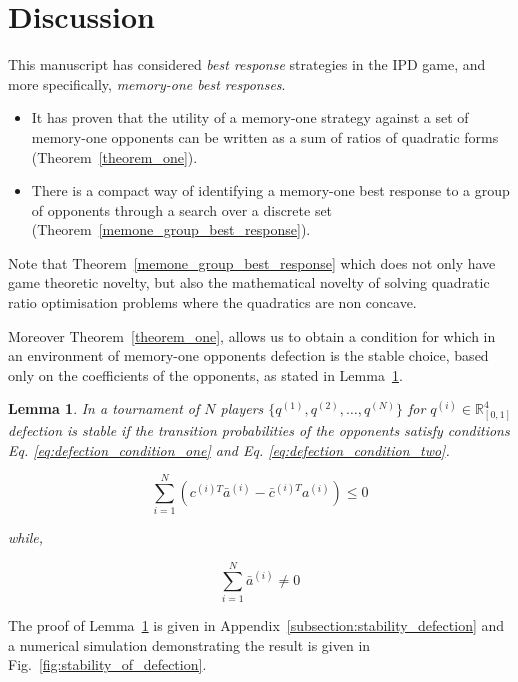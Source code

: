 \documentclass[10pt]{article}
\newcommand{\R}{\mathbb{R}}
\newtheorem{lemma}[theorem]{Lemma}
\begin{document}
\section{Discussion}
This manuscript has considered \textit{best response} strategies in the IPD game, and
more specifically, \textit{memory-one best responses}.

\begin{itemize}
    \item It has proven that the utility
          of a memory-one strategy against a set of memory-one opponents can be written as a sum
          of ratios of quadratic forms (Theorem~\ref{theorem_one}).
    \item  There is a compact way of identifying a memory-one best response to a
        group of opponents through a search over a discrete set
        (Theorem~\ref{memone_group_best_response}).
\end{itemize}

Note that Theorem~\ref{memone_group_best_response} which does not only have game theoretic
novelty, but also the mathematical novelty of solving quadratic ratio optimisation
problems where the quadratics are non concave.

Moreover Theorem~\ref{theorem_one}, allows us to
obtain a condition for which in an environment of memory-one opponents
defection is the stable choice, based only on the coefficients of the opponents,
as stated in Lemma~\ref{lemma:stability_of_defection}.

\begin{lemma}\label{lemma:stability_of_defection}
    In a tournament of \(N\) players \(\{q^{(1)}, q^{(2)}, \dots, q^{(N)} \}\)
    for \(q^{(i)} \in \R_{[0, 1]} ^ 4\)
    defection is stable if the transition probabilities of the
    opponents satisfy conditions Eq. \ref{eq:defection_condition_one} and Eq. \ref{eq:defection_condition_two}.

    \begin{equation}\label{eq:defection_condition_one}
        \sum_{i=1} ^ N (c^{(i)T} \bar{a}^{(i)} - \bar{c}^{(i)T} a^{(i)}) \leq 0
    \end{equation}

    while,

    \begin{equation}\label{eq:defection_condition_two}
        \sum_{i=1} ^ N \bar{a}^{(i)} \neq 0
    \end{equation}
\end{lemma}

The proof of Lemma~\ref{lemma:stability_of_defection} is given in
Appendix~\ref{subsection:stability_defection} and a numerical simulation
demonstrating the result is given
in Fig.~\ref{fig:stability_of_defection}.
\end{document}
